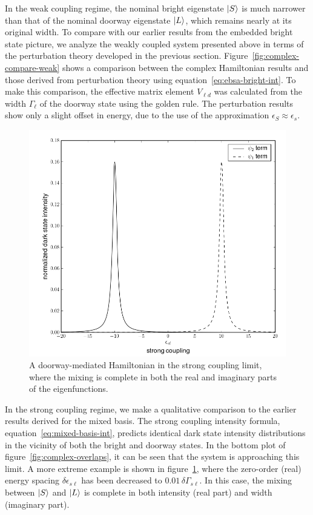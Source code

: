 \documentclass[12pt]{mitthesis}
\begin{document}
In the weak coupling regime, the nominal bright eigenstate $\mathinner{|{S}\rangle}$
is much narrower than that of the nominal doorway eigenstate
$\mathinner{|{L}\rangle}$, which remains nearly at its original width.  To compare
with our earlier results from the embedded bright state picture, we
analyze the weakly coupled system presented above in terms of the
perturbation theory developed in the previous section.
Figure~\ref{fig:complex-compare-weak} shows a comparison between the
complex Hamiltonian results and those derived from perturbation theory
using equation~\ref{eq:ebsa-bright-int}. To make this comparison, the
effective matrix element $V_{\ell d}$ was calculated from the width
$\Gamma_\ell$ of the doorway state using the golden rule. The
perturbation results show only a slight offset in energy, due to the
use of the approximation $\epsilon_{S} \approx \epsilon_{s}$.

\begin{figure}
  \caption{A doorway-mediated Hamiltonian in the strong coupling
    limit, where the mixing is complete in both the real and imaginary
    parts of the eigenfunctions.}
  \label{fig:complex-compare-strong}
  \centering
  \includegraphics[width=6in]{complex-compare-strong.png}
\end{figure}

In the strong coupling regime, we make a qualitative comparison to the
earlier results derived for the mixed basis.  The strong coupling
intensity formula, equation~\ref{eq:mixed-basis-int}, predicts
identical dark state intensity distributions in the vicinity of both
the bright and doorway states.  In the bottom plot of
figure~\ref{fig:complex-overlaps}, it can be seen that the system is
approaching this limit.  A more extreme example is shown in
figure~\ref{fig:complex-compare-strong}, where the zero-order (real)
energy spacing $\delta \epsilon_{s\ell}$ has been decreased to $0.01 \,
\delta \Gamma_{s\ell}$. In this case, the mixing between $\mathinner{|{S}\rangle}$ and
$\mathinner{|{L}\rangle}$ is complete in both intensity (real part) and width
(imaginary part).
\end{document}
